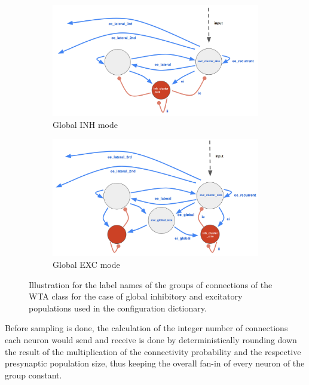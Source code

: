 \begin{figure}[h]
    \centering
    \begin{subfigure}{.49\textwidth}
        \includegraphics[width=\textwidth]{img/appendices/global_inh_wta_connection_labels.png}
        \caption{Global INH mode}
        \label{fig:global_inh_wta_connectivity_labels}
    \end{subfigure}
    \begin{subfigure}{.49\textwidth}
        \includegraphics[width=\textwidth]{img/appendices/local_inh_wta_connection_labels.png}
        \caption{Global EXC mode}
        \label{fig:local_inh_wta_connectivity_labels}
    \end{subfigure}
    \caption[Illustration for the label names of the groups of connections of the WTA class]{Illustration for the label names of the groups of connections of the WTA class for the case of global inhibitory and excitatory populations used in the configuration dictionary.}
    \label{fig:local_inh_wta_connectivity_labels}
\end{figure}

 Before sampling is done, the calculation of the integer number of connections each neuron would send and receive is done by deterministically rounding down the result of the multiplication of the connectivity probability and the respective presynaptic population size, thus keeping the overall fan-in of every neuron of the group constant.

